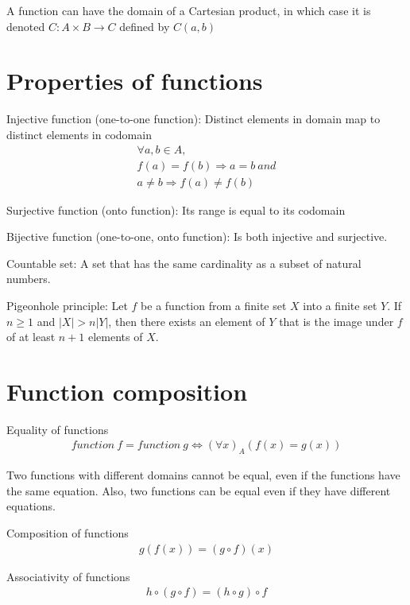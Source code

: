\documentclass{article}
\begin{document}
A function can have the domain of a Cartesian product, in which case it is denoted $C: A \times B \rightarrow C$ defined by $C(a, b)$

\section{Properties of functions}

Injective function (one-to-one function): Distinct elements in domain map to distinct elements in codomain
\begin{gather*}
    \forall a, b \in A, \\
    f(a) = f(b) \Rightarrow a = b\ and \\
    a \neq b \Rightarrow f(a) \neq f(b)
\end{gather*}

Surjective function (onto function): Its range is equal to its codomain

Bijective function (one-to-one, onto function): Is both injective and surjective.

Countable set: A set that has the same cardinality as a subset of natural numbers.

Pigeonhole principle: Let $f$ be a function from a finite set $X$ into a finite set $Y$. If $n \geq 1$ and $|X| > n|Y|$, then there exists an element of $Y$ that is the image under $f$ of at least $n + 1$ elements of $X$.

\section{Function composition}

Equality of functions
\begin{gather*}
    function\ f = function\ g \Leftrightarrow (\forall x)_A(f(x) = g(x))
\end{gather*}

Two functions with different domains cannot be equal, even if the functions have the same equation. Also, two functions can be equal even if they have different equations.

Composition of functions
\begin{gather*}
    g(f(x)) = (g \circ f)(x)
\end{gather*}

Associativity of functions
\begin{gather*}
    h \circ (g \circ f) = (h \circ g) \circ f
\end{gather*}
\end{document}

